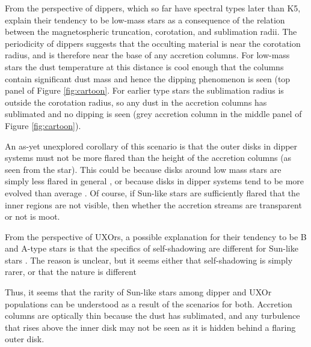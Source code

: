 \documentclass[useAMS,usenatbib,usegraphicx]{mn2e}
\begin{document}
From the perspective of dippers, which so far have spectral types later than K5,
\citet{2016arXiv160503985B} explain their tendency to be low-mass stars as a consequence
of the relation between the magnetospheric truncation, corotation, and sublimation
radii. The periodicity of dippers suggests that the occulting material is near the
corotation radius, and is therefore near the base of any accretion columns. For low-mass
stars the dust temperature at this distance is cool enough that the columns contain
significant dust mass and hence the dipping phenomenon is seen (top panel of Figure
\ref{fig:cartoon}. For earlier type stars the sublimation radius is outside the
corotation radius, so any dust in the accretion columns has sublimated and no dipping is
seen (grey accretion column in the middle panel of Figure \ref{fig:cartoon}).

An as-yet unexplored corollary of this scenario is that the outer disks in dipper systems
must not be more flared than the height of the accretion columns (as seen from the
star). This could be because disks around low mass stars are simply less flared in
general \citep[e.g.][]{2010ApJ...720.1668S}, or because disks in dipper systems tend to
be more evolved than average \citep{2016ApJ...816...69A}. Of course, if Sun-like stars
are sufficiently flared that the inner regions are not visible, then whether the
accretion streams are transparent or not is moot.

From the perspective of UXOrs, a possible explanation for their tendency to be B and
A-type stars is that the specifics of self-shadowing are different for Sun-like stars
\citep{2003ApJ...594L..47D}. The reason is unclear, but it seems either that
self-shadowing is simply rarer, or that the nature is different \citep[i.e. shadowing by
the inner disk regions, rather than by a puffed-up inner rim,
see]{2004A&A...421.1075D,2007prpl.conf..555D}

Thus, it seems that the rarity of Sun-like stars among dipper and UXOr populations can be
understood as a result of the scenarios for both. Accretion columns are optically thin
because the dust has sublimated, and any turbulence that rises above the inner disk may
not be seen as it is hidden behind a flaring outer disk.
\end{document}
